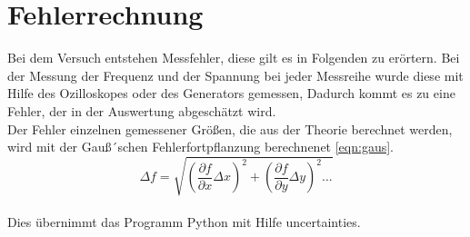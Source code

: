 \section{Fehlerrechnung}
 \label{fehlerrechnung}
Bei dem Versuch entstehen Messfehler,
diese gilt es in Folgenden zu erörtern.
Bei der Messung der Frequenz und der Spannung bei jeder Messreihe
wurde diese mit Hilfe des Ozilloskopes oder des Generators gemessen,
Dadurch kommt es zu eine Fehler, der in der Auswertung abgeschätzt wird.
\\
Der Fehler einzelnen gemessener Größen, die aus der Theorie berechnet werden, wird mit der Gauß´schen Fehlerfortpflanzung
berechnenet \eqref{eqn:gaus}.
\begin{equation}
\Delta f= \sqrt{\left(\frac{\partial f}{\partial x}\Delta x \right)^{2} + \left( \frac{\partial f}{\partial y}\Delta y\right)^2...}\label{eqn:gaus}
\end{equation}
\\
Dies übernimmt das Programm Python mit Hilfe uncertainties.
